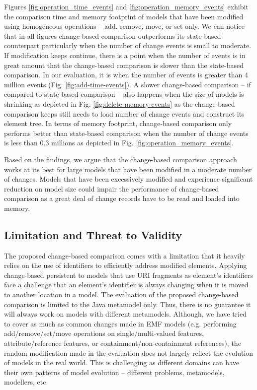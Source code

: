 \documentclass{jot}
\begin{document}
Figures \ref{fig:operation_time_events} and \ref{fig:operation_memory_events} exhibit the comparison time and memory footprint of models that have been modified using homogeneous operations -- \textsf{add}, \textsf{remove}, \textsf{move}, or \textsf{set} only. We can notice that in all figures change-based comparison outperforms its state-based counterpart particularly when the number of change events is small to moderate. If modification keeps continue, there is a point when the number of events is in great amount that the change-based comparison is slower than the state-based comparison. In our evaluation, it is when the number of events is greater than 4 million events (Fig. \ref{fig:add-time-events}). A slower change-based comparison -- if compared to state-based comparison -- also happens when the size of models is shrinking as depicted in Fig. \ref{fig:delete-memory-events} as the change-based comparison keeps still needs to load number of change events and construct its element tree. In terms of memory footprint, change-based comparison only performs better than state-based comparison when the number of change events is less than 0.3 millions as depicted in Fig. \ref{fig:operation_memory_events}.

Based on the findings, we argue that the change-based comparison approach works at its best for large models that have been modified in a moderate number of changes. Models that have been excessively modified and experience significant reduction on model size could impair the performance of change-based comparison as a great deal of change records have to be read and loaded into memory. 

\subsection{Limitation and Threat to Validity}
\label{sec:limitation_and_Threat_to_validity}
The proposed change-based comparison comes with a limitation that it heavily relies on the use of identifiers to efficiently address modified elements. Applying change-based persistent to models that use URI fragments as element's identifiers face a challenge that an element's identifier is always changing when it is moved to another location in a model. The evaluation of the proposed change-based comparison is limited to the Java metamodel only. Thus, there is no guarantee it will always work on models with different metamodels. Although, we have tried to cover as much as common changes made in EMF models (e.g. performing \textsf{add}/\textsf{remove}/\textsf{set}/\textsf{move} operations on \textsf{single}/\textsf{multi}-\textsf{valued} features, \textsf{attribute}/\textsf{reference} features, or \textsf{containment}/\textsf{non}-\textsf{containment} references), the random modification made in the evaluation does not largely reflect the evolution of models in the real world. This is challenging as different domains can have their own patterns of model evolution -- different problems, metamodels, modellers, etc.
\end{document}
